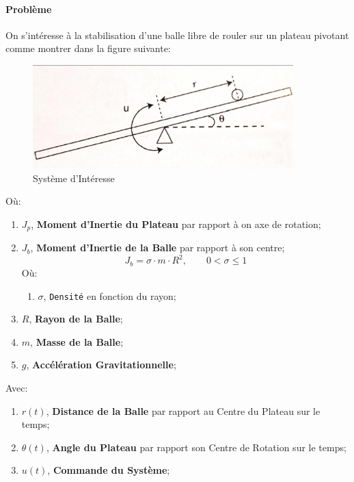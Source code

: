 \documentclass[class=article, crop=false]{standalone}
\begin{document}
\paragraph{Problème}On s'intéresse à la stabilisation d'une balle libre de rouler sur un plateau pivotant comme montrer dans la figure suivante:
\begin{figure}[H]
    \centering
    \includegraphics[height = 40mm]{../images/system.png}
    \caption{Système d'Intéresse}
    \label{fig:system}
\end{figure}
Où:
\begin{enumerate}[noitemsep, rightmargin = \leftmargin]
    \item $J_p$, \textbf{Moment d'Inertie du Plateau} par rapport à on axe de rotation;
    \item $J_b$, \textbf{Moment d'Inertie de la Balle} par rapport à son centre;
    \begin{equation}\label{eq:def_Jb}
        J_b = \sigma \cdot m \cdot R^2,
        \qquad
        0 < \sigma \leq 1
    \end{equation}
    Où:
    \begin{enumerate}[noitemsep, rightmargin = \leftmargin]
        \item $\sigma$, \texttt{Densité} en fonction du rayon;
    \end{enumerate}

    \item $R$, \textbf{Rayon de la Balle};
    \item $m$, \textbf{Masse de la Balle};
    \item $g$, \textbf{Accélération Gravitationnelle};
\end{enumerate}
Avec:
\begin{enumerate}[noitemsep, rightmargin = \leftmargin]
    \item $r(t)$, \textbf{Distance de la Balle} par rapport au Centre du Plateau sur le temps;
    \item $\theta(t)$, \textbf{Angle du Plateau} par rapport son Centre de Rotation sur le temps;
    \item $u(t)$, \textbf{Commande du Système};
\end{enumerate}
\end{document}
